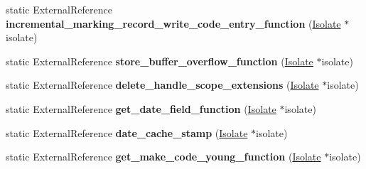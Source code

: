 \begin{DoxyCompactItemize}
\item 
static External\+Reference {\bfseries incremental\+\_\+marking\+\_\+record\+\_\+write\+\_\+code\+\_\+entry\+\_\+function} (\hyperlink{classv8_1_1internal_1_1_isolate}{Isolate} $\ast$isolate)\hypertarget{classv8_1_1internal_1_1_b_a_s_e___e_m_b_e_d_d_e_d_a8e7332a421d84b7e7efd276ff2c843ce}{}\label{classv8_1_1internal_1_1_b_a_s_e___e_m_b_e_d_d_e_d_a8e7332a421d84b7e7efd276ff2c843ce}

\item 
static External\+Reference {\bfseries store\+\_\+buffer\+\_\+overflow\+\_\+function} (\hyperlink{classv8_1_1internal_1_1_isolate}{Isolate} $\ast$isolate)\hypertarget{classv8_1_1internal_1_1_b_a_s_e___e_m_b_e_d_d_e_d_aa4f083be33dd4367bc3c9530c771dd0e}{}\label{classv8_1_1internal_1_1_b_a_s_e___e_m_b_e_d_d_e_d_aa4f083be33dd4367bc3c9530c771dd0e}

\item 
static External\+Reference {\bfseries delete\+\_\+handle\+\_\+scope\+\_\+extensions} (\hyperlink{classv8_1_1internal_1_1_isolate}{Isolate} $\ast$isolate)\hypertarget{classv8_1_1internal_1_1_b_a_s_e___e_m_b_e_d_d_e_d_acf205faf5020bab5f59b4e6f0dd98e33}{}\label{classv8_1_1internal_1_1_b_a_s_e___e_m_b_e_d_d_e_d_acf205faf5020bab5f59b4e6f0dd98e33}

\item 
static External\+Reference {\bfseries get\+\_\+date\+\_\+field\+\_\+function} (\hyperlink{classv8_1_1internal_1_1_isolate}{Isolate} $\ast$isolate)\hypertarget{classv8_1_1internal_1_1_b_a_s_e___e_m_b_e_d_d_e_d_ab9a67d22c62c7c797dfea178e2107f32}{}\label{classv8_1_1internal_1_1_b_a_s_e___e_m_b_e_d_d_e_d_ab9a67d22c62c7c797dfea178e2107f32}

\item 
static External\+Reference {\bfseries date\+\_\+cache\+\_\+stamp} (\hyperlink{classv8_1_1internal_1_1_isolate}{Isolate} $\ast$isolate)\hypertarget{classv8_1_1internal_1_1_b_a_s_e___e_m_b_e_d_d_e_d_aa7cf001d0976d6c160a2262c66a11421}{}\label{classv8_1_1internal_1_1_b_a_s_e___e_m_b_e_d_d_e_d_aa7cf001d0976d6c160a2262c66a11421}

\item 
static External\+Reference {\bfseries get\+\_\+make\+\_\+code\+\_\+young\+\_\+function} (\hyperlink{classv8_1_1internal_1_1_isolate}{Isolate} $\ast$isolate)\hypertarget{classv8_1_1internal_1_1_b_a_s_e___e_m_b_e_d_d_e_d_a3f262f61d450c537f059f54e3f597f25}{}\label{classv8_1_1internal_1_1_b_a_s_e___e_m_b_e_d_d_e_d_a3f262f61d450c537f059f54e3f597f25}


\end{DoxyCompactItemize}
